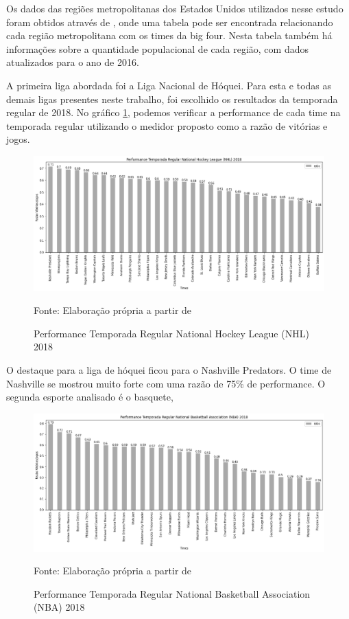 \documentclass[12pt,oneside,a4paper,chapter=TITLE,english,brazil,sumario=abnt-6027-2012]{abntex2}
\begin{document}
Os dados das regiões metropolitanas dos Estados Unidos utilizados nesse estudo foram obtidos através de , onde uma tabela pode ser encontrada relacionando cada região metropolitana com os times da big four. Nesta tabela também há informações sobre a quantidade populacional de cada região, com dados atualizados para o ano de 2016.

A primeira liga abordada foi a Liga Nacional de Hóquei. Para esta e todas as demais ligas presentes neste trabalho, foi escolhido os resultados da temporada regular de 2018. No gráfico \ref{nhl}, podemos verificar a performance de cada time na temporada regular utilizando o medidor proposto como a razão de vitórias e jogos.

\begin{figure}[H]
	\centering
	\caption{Performance Temporada Regular National Hockey League (NHL) 2018}
	\includegraphics[scale=0.4]{../../output/figures/nhl.png}
	\label{nhl}
	\\ \vspace{0.25cm}
	\raggedright
	\footnotesize{Fonte: Elaboração própria a partir de }
\end{figure}

O destaque para a liga de hóquei ficou para o Nashville Predators. O time de Nashville se mostrou muito forte com uma razão de 75\% de performance. O segunda esporte analisado é o basquete, 

\begin{figure}[H]
	\centering
	\caption{Performance Temporada Regular National Basketball Association (NBA) 2018}
	\includegraphics[scale=0.4]{../../output/figures/nba.png}
	\label{dist}
	\\ \vspace{0.25cm}
	\raggedright
	\footnotesize{Fonte: Elaboração própria a partir de }
\end{figure}
\end{document}
